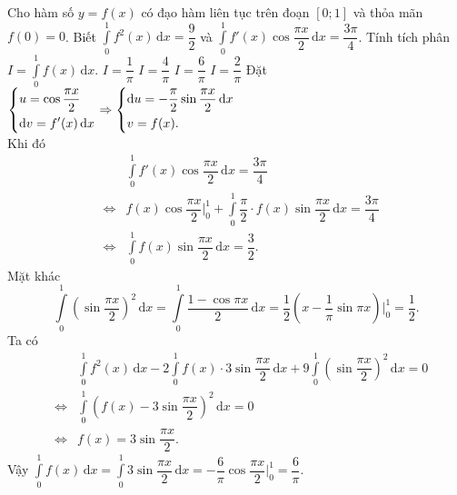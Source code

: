 \begin{ex}%
	Cho hàm số $y=f(x)$ có đạo hàm liên tục trên đoạn $[0;1]$ và thỏa mãn $f(0)=0$. Biết $\displaystyle\int\limits_0^1 f^2(x)\mathrm{\,d}x=\dfrac{9}{2}$ và $\displaystyle\int\limits_0^1 f'(x)\cos\dfrac{\pi x}{2}\mathrm{\,d}x=\dfrac{3\pi}{4}$. Tính tích phân $I=\displaystyle\int\limits_0^1 f(x)\mathrm{\,d}x$.
	\choice
	{$I=\dfrac{1}{\pi}$}
	{$I=\dfrac{4}{\pi}$}
	{\True $I=\dfrac{6}{\pi}$}
	{$I=\dfrac{2}{\pi}$}
	\loigiai
	{
		Đặt $\left\{\begin{aligned}&u=\cos\dfrac{\pi x}{2}\\&\mathrm{d}v=f'(x)\mathrm{\,d}x\end{aligned}\right.\Rightarrow\left\{\begin{aligned}&\mathrm{d}u=-\dfrac{\pi}{2}\sin\dfrac{\pi x}{2}\mathrm{\,d}x\\&v=f(x).\end{aligned}\right.$\\
		Khi đó 
		\begin{eqnarray*}
			& &\displaystyle\int\limits_0^1 f'(x)\cos\dfrac{\pi x}{2}\mathrm{\,d}x=\dfrac{3\pi}{4} \\
			& \Leftrightarrow & f(x)\cos\dfrac{\pi x}{2}\bigg|_0^1+\displaystyle\int\limits_0^1 \dfrac{\pi}{2}\cdot f(x)\sin\dfrac{\pi x}{2}\mathrm{\,d}x=\dfrac{3\pi}{4} \\
			&\Leftrightarrow&\displaystyle\int\limits_0^1 f(x)\sin\dfrac{\pi x}{2}\mathrm{\,d}x=\dfrac{3}{2}. 
		\end{eqnarray*}
		Mặt khác 
		\[\displaystyle\int\limits_0^1\left(\sin\dfrac{\pi x}{2}\right)^2\mathrm{\,d}x=\displaystyle\int\limits_0^1\dfrac{1-\cos\pi x}{2}\mathrm{\,d}x=\dfrac{1}{2}\left(x-\dfrac{1}{\pi}\sin\pi x\right)\bigg|_0^1=\dfrac{1}{2}.\]
		Ta có 
		\begin{eqnarray*}
			& & \displaystyle\int\limits_0^1 f^2(x)\mathrm{\,d}x-2\displaystyle\int\limits_0^1 f(x)\cdot3\sin\dfrac{\pi x}{2}\mathrm{\,d}x+9\displaystyle\int\limits_0^1\left(\sin\dfrac{\pi x}{2}\right)^2\mathrm{\,d}x=0 \\
			& \Leftrightarrow & \displaystyle\int\limits_0^1 \left(f(x)-3\sin\dfrac{\pi x}{2}\right)^2\mathrm{\,d}x=0\\
			& \Leftrightarrow & f(x)=3\sin\dfrac{\pi x}{2}.
		\end{eqnarray*}
	Vậy $\displaystyle\int\limits_0^1 f(x)\mathrm{\,d}x=\displaystyle\int\limits_0^1 3\sin\dfrac{\pi x}{2}\mathrm{\,d}x=-\dfrac{6}{\pi}\cos\dfrac{\pi x}{2}\bigg|_0^1=\dfrac{6}{\pi}$.
	}
\end{ex}

